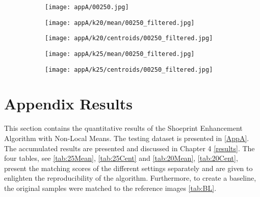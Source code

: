 \documentclass[draft,final]{vutinfth} %
\begin{document}
\begin{appendices}
\begin{figure}[h]
\centering
  \begin{subfigure}[t]{0.19\columnwidth}
    \centering
    \texttt{[image: appA/00250.jpg]}
  \end{subfigure}
  \begin{subfigure}[t]{0.19\columnwidth}
    \centering
    \texttt{[image: appA/k20/mean/00250\_filtered.jpg]}
  \end{subfigure}
  \begin{subfigure}[t]{0.19\columnwidth}
    \centering
    \texttt{[image: appA/k20/centroids/00250\_filtered.jpg]}
  \end{subfigure}
  \begin{subfigure}[t]{0.19\columnwidth}
    \centering
    \texttt{[image: appA/k25/mean/00250\_filtered.jpg]}
  \end{subfigure}
  \begin{subfigure}[t]{0.19\columnwidth}
    \centering
    \texttt{[image: appA/k25/centroids/00250\_filtered.jpg]}
  \end{subfigure}
\caption{}
\end{figure}  

\chapter{Appendix Results}
\label{AppB}
		This section contains the quantitative results of the Shoeprint Enhancement Algorithm with Non-Local Means.
		The testing dataset is presented in \ref{AppA}.
		The accumulated results are presented and discussed in Chapter 4 \ref{results}.
		The four tables, see \ref{tab:25Mean}, \ref{tab:25Cent} and \ref{tab:20Mean}, \ref{tab:20Cent}, present the matching scores of the different settings separately and are given to enlighten the reproducibility of the algorithm.
		Furthermore, to create a baseline, the original samples were matched to the reference images \ref{tab:BL}.


\end{appendices}
\end{document}
